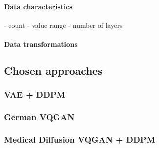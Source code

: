 \paragraph{Data characteristics}
- count
- value range
- number of layers
\paragraph{Data transformations}

\newpage
\subsection{Chosen approaches}
\subsubsection{VAE + DDPM}

\newpage
\subsubsection{German VQGAN}

\newpage
\subsubsection{Medical Diffusion VQGAN + DDPM}



% 